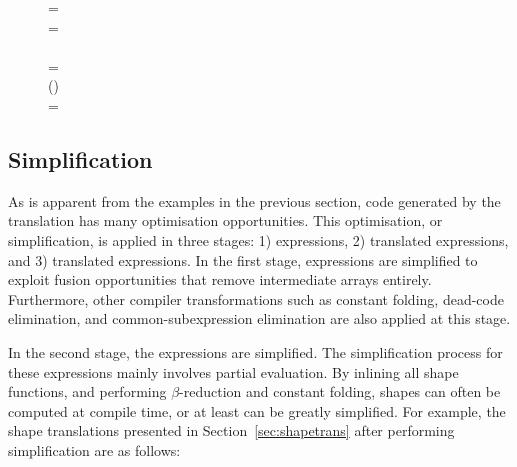 \begin{figure}[H]
\hfill\begin{minipage}{.75\textwidth}\raggedright
{}  = 
\\
  = 
\\
\tabt 
\\
  = 
\\
\tabt
{}  
()
\\
  = 
\end{minipage}\hfill
\end{figure}

\subsection{Simplification}
\label{sec_simplification}


As is apparent from the examples in the previous section,
code generated by the translation has many optimisation opportunities.
This optimisation, or simplification, is applied in three stages: 1) \lafsharp{} expressions, 2) translated \shapefsmooth{} expressions, and 3) translated \salafsharp{} expressions. In the first stage, \lafsharp{} expressions are simplified to exploit fusion opportunities that remove intermediate arrays entirely. Furthermore, other compiler transformations such as constant folding, dead-code elimination, and common-subexpression elimination are also applied at this stage.

In the second stage, the \shapefsmooth{} expressions are simplified. The simplification process for these expressions mainly involves partial evaluation. By inlining all shape functions, and performing $\beta$-reduction and constant folding, shapes can often be computed at compile time, or at least can be greatly simplified. For example, the shape translations presented in Section~\ref{sec:shapetrans} after performing simplification are as follows:


